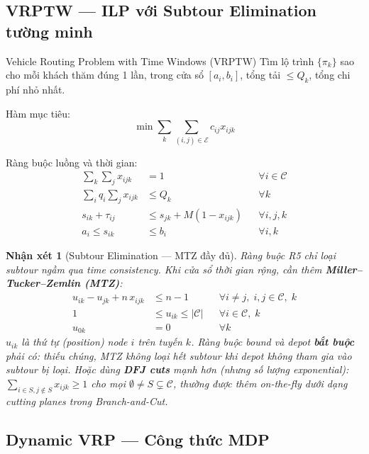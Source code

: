\documentclass[12pt,a4paper]{article}
\newtheorem{remark}{Nhận xét}[section]
\begin{document}
\subsection{VRPTW --- ILP với Subtour Elimination tường minh}

\begin{definitionbox}{Vehicle Routing Problem with Time Windows (VRPTW)}
Tìm lộ trình $\{\pi_k\}$ sao cho mỗi khách thăm đúng 1 lần,
trong cửa sổ $[a_i,b_i]$, tổng tải $\leq Q_k$, tổng chi phí nhỏ nhất.
\end{definitionbox}

Hàm mục tiêu:
\begin{equation}
  \min\sum_k\sum_{(i,j)\in\mathcal{E}}c_{ij}x_{ijk}
\end{equation}

Ràng buộc luồng và thời gian:
\begin{align}
  \sum_k\sum_j x_{ijk} &= 1 &&\forall i\in\mathcal{C} \tag{R1}\\
  \sum_i q_i\sum_j x_{ijk} &\leq Q_k &&\forall k \tag{R4}\\
  s_{ik}+\tau_{ij} &\leq s_{jk}+M(1-x_{ijk}) &&\forall i,j,k \tag{R5}\\
  a_i \leq s_{ik} &\leq b_i &&\forall i,k \tag{R6}
\end{align}

\begin{remark}[Subtour Elimination --- MTZ đầy đủ]
Ràng buộc R5 chỉ loại subtour \emph{ngầm} qua time consistency.
Khi cửa sổ thời gian rộng, cần thêm \textbf{Miller--Tucker--Zemlin (MTZ)}:
\begin{align}
  u_{ik} - u_{jk} + n\,x_{ijk} &\leq n-1 &&\forall i\neq j,\;i,j\in\mathcal{C},\;k
  \tag{MTZ}\\
  1 &\leq u_{ik} \leq |\mathcal{C}| &&\forall i\in\mathcal{C},\;k
  \tag{MTZ-bound}\\
  u_{0k} &= 0 &&\forall k
  \tag{MTZ-depot}
\end{align}
$u_{ik}$ là thứ tự (position) node $i$ trên tuyến $k$. Ràng buộc bound và
depot \textbf{bắt buộc} phải có: thiếu chúng, MTZ không loại hết subtour
khi depot không tham gia vào subtour bị loại.
Hoặc dùng \textbf{DFJ cuts} mạnh hơn (nhưng số lượng exponential):
$\sum_{i\in S,j\notin S}x_{ijk}\geq 1$ cho mọi $\emptyset\neq S\subsetneq\mathcal{C}$,
thường được thêm on-the-fly dưới dạng cutting planes trong Branch-and-Cut.
\end{remark}

\subsection{Dynamic VRP --- Công thức MDP}
\end{document}
